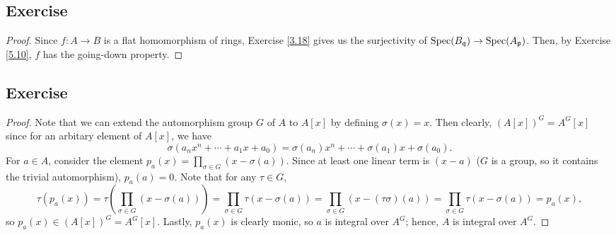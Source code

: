 \subsection{Exercise}\label{5.11}

\begin{proof}
Since $f : A \to B$ is a flat homomorphism of rings, Exercise \ref{3.18} gives us the surjectivity of $\operatorname{Spec}(B_{\mathfrak{q}}) \to \operatorname{Spec}(A_{\mathfrak{p}})$. 
Then, by Exercise \ref{5.10}, $f$ has the going-down property.
\end{proof}

\subsection{Exercise}\label{5.12}

\begin{proof}
Note that we can extend the automorphism group $G$ of $A$ to $A[x]$ by defining $\sigma(x) = x$. Then clearly, $(A[x])^G = A^G[x]$ since for
an arbitary element of $A[x]$, we have
$$\sigma\left(a_n x^n + \cdots + a_1 x + a_0\right) = \sigma(a_n) x^n + \cdots + \sigma(a_1) x + \sigma(a_0).$$
For $a \in A$, consider the element $p_a(x) = \prod_{\sigma \in G}(x - \sigma(a))$. Since at least one linear term is $(x - a)$ ($G$ is a group, 
so it contains the trivial automorphism), $p_a(a) = 0$. Note that for any $\tau \in G$,
$$\tau(p_a(x)) = \tau\left(\prod_{\sigma \in G}(x - \sigma(a))\right) = \prod_{\sigma \in G}\tau(x - \sigma(a))
= \prod_{\sigma \in G}(x - (\tau\sigma)(a)) = \prod_{\sigma \in G}\tau(x - \sigma(a)) = p_a(x),$$
so $p_a(x) \in (A[x])^G = A^G[x]$. Lastly, $p_a(x)$ is clearly monic, so $a$ is integral over $A^G$; hence, $A$ is integral over $A^G$.
\end{proof}

